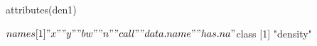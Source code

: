 \begin{Schunk}
\begin{Sinput}
 attributes(den1)
\end{Sinput}
\begin{Soutput}
$names
[1] "x"         "y"         "bw"        "n"         "call"      "data.name" "has.na"   

$class
[1] "density"
\end{Soutput}
\end{Schunk}
